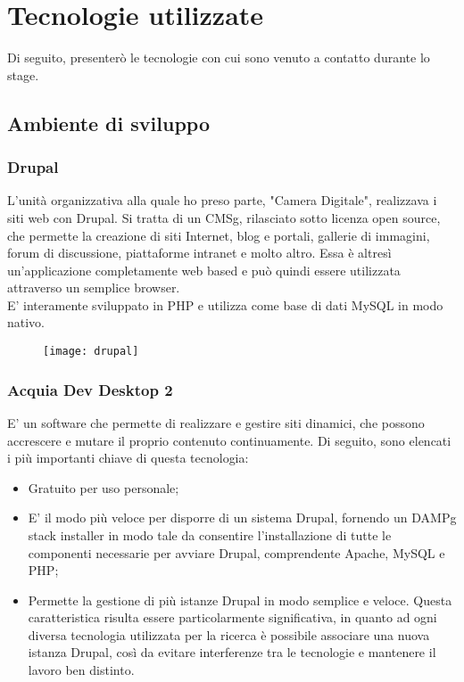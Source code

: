\section{Tecnologie utilizzate}
\label{sec:tecnologie_utilizzate}
Di seguito, presenterò le tecnologie con cui sono venuto a contatto durante lo stage.
	
	\subsection{Ambiente di sviluppo}
	
		\subsubsection{Drupal}
		L'unità organizzativa alla quale ho preso parte, "Camera Digitale", realizzava i siti web con \gls{Drupal}. Si tratta di un \gls{CMSg}, rilasciato sotto licenza \gls{open source}, che permette la creazione di siti Internet, blog e portali, gallerie di immagini, forum di discussione, piattaforme intranet e molto altro. Essa è altresì un’applicazione completamente web based e può quindi essere utilizzata attraverso un semplice browser. \\
		E' interamente sviluppato in \gls{PHP} e utilizza come base di dati \gls{MySQL} in modo nativo.
		
		\begin{figure}[htbp]
			\begin{center}
				\texttt{[image: drupal]}
			\end{center}
		\end{figure}
	
		\subsubsection{Acquia Dev Desktop 2}
		E’ un software che permette di realizzare e gestire siti dinamici, che possono accrescere e mutare il proprio contenuto continuamente.
		Di seguito, sono elencati i più importanti chiave di questa tecnologia:
		\begin{itemize}
			\item {Gratuito per uso personale;}
			\item {E' il modo più veloce per disporre di un sistema \gls{Drupal}, fornendo un \gls{DAMPg} stack installer in modo tale da consentire l'installazione di tutte le componenti necessarie per avviare \gls{Drupal}, comprendente \gls{Apache}, \gls{MySQL} e \gls{PHP};}
			\item {Permette la gestione di più istanze \gls{Drupal} in modo semplice e veloce. Questa caratteristica risulta essere particolarmente significativa, in quanto ad ogni diversa tecnologia utilizzata per la ricerca è possibile associare una nuova istanza \gls{Drupal}, così da evitare interferenze tra le tecnologie e mantenere il lavoro ben distinto.}
		\end{itemize}
	
